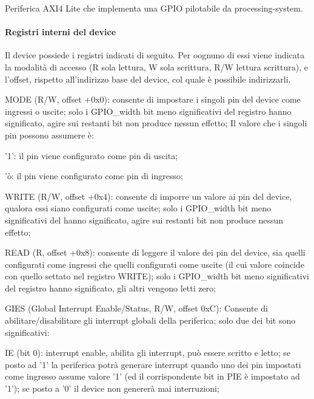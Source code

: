 Periferica A\+X\+I4 Lite che implementa una G\+P\+I\+O pilotabile da processing-\/system. \paragraph*{Registri interni del device}

Il device possiede i registri indicati di seguito. Per oognuno di essi viene indicata la modalità di accesso (R sola lettura, W sola scrittura, R/\+W lettura scrittura), e l'offset, rispetto all'indirizzo base del device, col quale è possibile indirizzarli.


\begin{DoxyItemize}
\item M\+O\+D\+E (R/\+W, offset +0x0)\+: consente di impostare i singoli pin del device come ingressi o uscite; solo i G\+P\+I\+O\+\_\+width bit meno significativi del registro hanno significato, agire sui restanti bit non produce nessun effetto; Il valore che i singoli pin possono assumere è\+:
\begin{DoxyItemize}
\item '1'\+: il pin viene configurato come pin di uscita;
\item 'ò\+: il pin viene configurato come pin di ingresso;
\end{DoxyItemize}
\item W\+R\+I\+T\+E (R/\+W, offset +0x4)\+: consente di imporre un valore ai pin del device, qualora essi siano configurati come uscite; solo i G\+P\+I\+O\+\_\+width bit meno significativi del hanno significato, agire sui restanti bit non produce nessun effetto;
\item R\+E\+A\+D (R, offset +0x8)\+: consente di leggere il valore dei pin del device, sia quelli configurati come ingressi che quelli configurati come uscite (il cui valore coincide con quello settato nel registro W\+R\+I\+T\+E); solo i G\+P\+I\+O\+\_\+width bit meno significativi del registro hanno significato, gli altri vengono letti zero;
\item G\+I\+E\+S (Global Interrupt Enable/\+Status, R/\+W, offset 0x\+C)\+: Consente di abilitare/disabilitare gli interrupt globali della periferica; solo due dei bit sono significativi\+:
\begin{DoxyItemize}
\item I\+E (bit 0)\+: interrupt enable, abilita gli interrupt, può essere scritto e letto; se posto ad '1' la periferica potrà generare interrupt quando uno dei pin impostati come ingresso assume valore '1' (ed il corrispondente bit in P\+I\+E è impostato ad '1'); se posto a '0' il device non genererà mai interruzioni;

\end{DoxyItemize}
\end{DoxyItemize}
